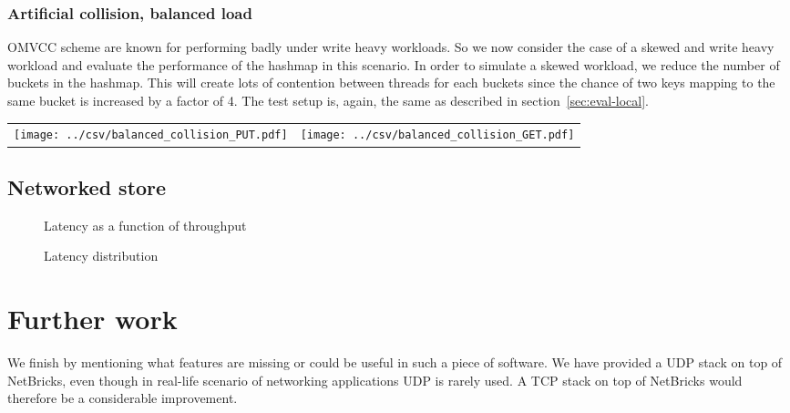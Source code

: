 \documentclass[11pt]{book}
\begin{document}
\subsection{Artificial collision, balanced load}

OMVCC scheme are known for performing badly under write heavy
workloads. So we now consider the case of a skewed and write heavy
workload and evaluate the performance of the hashmap in this
scenario. In order to simulate a skewed workload, we reduce the number
of buckets in the hashmap. This will create lots of contention between
threads for each buckets since the chance of two keys mapping to the
same bucket is increased by a factor of 4. The test setup is, again,
the same as described in section~\ref{sec:eval-local}.

\begin{center}
  \begin{tabular}{c c} \label{table:col-balanced}
    \texttt{[image: ../csv/balanced\_collision\_PUT.pdf]}
    &
      \texttt{[image: ../csv/balanced\_collision\_GET.pdf]}
  \end{tabular}
\end{center}

\section{Networked store}

\begin{figure}[htb!]
  \caption{Latency as a function of throughput}
  \label{fig:latency-throughput}
\end{figure}

\begin{figure}[htb!]
  \caption{Latency distribution}
  \label{fig:latency-distribution}
\end{figure}

\chapter{Further work}

We finish by mentioning what features are missing or could be useful
in such a piece of software. We have provided a UDP stack on top of
NetBricks, even though in real-life scenario of networking
applications UDP is rarely used. A TCP stack on top of NetBricks would
therefore be a considerable improvement.
\end{document}
